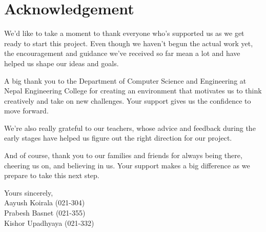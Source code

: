 \chapter*{Acknowledgement}

We'd like to take a moment to thank everyone who's supported us as we get ready to start this project. Even though we haven't begun the actual work yet, the encouragement and guidance we've received so far mean a lot and have helped us shape our ideas and goals.

A big thank you to the Department of Computer Science and Engineering at Nepal Engineering College for creating an environment that motivates us to think creatively and take on new challenges. Your support gives us the confidence to move forward.

We're also really grateful to our teachers, whose advice and feedback during the early stages have helped us figure out the right direction for our project.

And of course, thank you to our families and friends for always being there, cheering us on, and believing in us. Your support makes a big difference as we prepare to take this next step.

\vspace{1cm}

\noindent Yours sincerely,\\[0.3cm]
Aayush Koirala (021-304)\\
Prabesh Basnet (021-355)\\
Kishor Upadhyaya (021-332)
